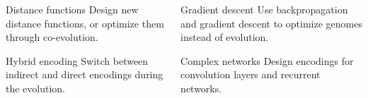   \begin{frame}{\tciii{} \fw}
    
    \begin{columns}
    \begin{column}{0.45\linewidth}
    \begin{center}
    \begin{block}{Distance functions}
    Design new distance functions, or optimize them through co-evolution.
    \end{block}
    
    \begin{block}{Hybrid encoding}
    Switch between indirect and direct encodings during the evolution.
    \end{block}
    \end{center}
    \end{column}
    
    \begin{column}{0.45\linewidth}
    \begin{center}
    \begin{block}{Gradient descent}
    Use backpropagation and gradient descent to optimize genomes instead of evolution.
    \end{block}
    
    \begin{block}{Complex networks}
    Design encodings for convolution layers and recurrent networks.
    \end{block}
    \end{center}
    \end{column}
    \end{columns}
    
    \end{frame}